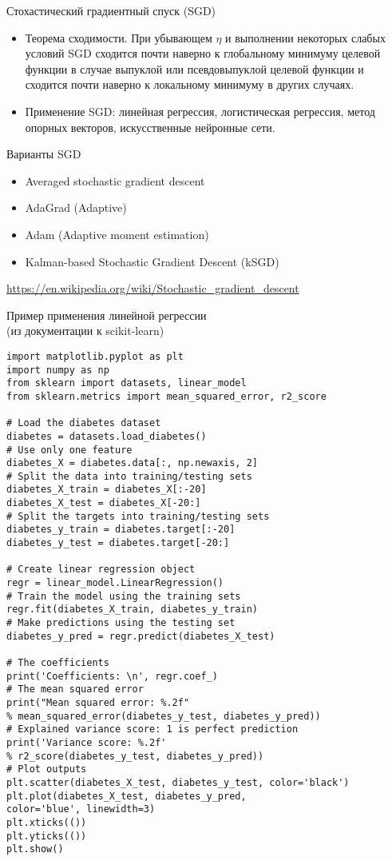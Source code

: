 \documentclass[landscape]{slides}
\begin{document}
\begin{slide}
Стохастический градиентный спуск (SGD)
\begin{itemize}
\item Теорема сходимости. При убывающем $\eta$ и выполнении некоторых слабых условий
SGD сходится почти наверно к глобальному минимуму целевой функции
в случае выпуклой или псевдовыпуклой целевой функции и сходится почти наверно
к локальному минимуму в других случаях.
\item Применение SGD: линейная регрессия, логистическая регрессия, метод опорных векторов,
искусственные нейронные сети.
\end{itemize}
\end{slide}

\begin{slide}
Варианты SGD
\begin{itemize}
\item Averaged stochastic gradient descent
\item AdaGrad (Adaptive)
\item Adam (Adaptive moment estimation)
\item Kalman-based Stochastic Gradient Descent (kSGD)
\end{itemize}
\url{https://en.wikipedia.org/wiki/Stochastic_gradient_descent}
\end{slide}

\begin{slide}
Пример применения линейной регрессии\\
(из документации к scikit-learn)
\begin{verbatim}
import matplotlib.pyplot as plt
import numpy as np
from sklearn import datasets, linear_model
from sklearn.metrics import mean_squared_error, r2_score

# Load the diabetes dataset
diabetes = datasets.load_diabetes()
# Use only one feature
diabetes_X = diabetes.data[:, np.newaxis, 2]
# Split the data into training/testing sets
diabetes_X_train = diabetes_X[:-20]
diabetes_X_test = diabetes_X[-20:]
# Split the targets into training/testing sets
diabetes_y_train = diabetes.target[:-20]
diabetes_y_test = diabetes.target[-20:]

# Create linear regression object
regr = linear_model.LinearRegression()
# Train the model using the training sets
regr.fit(diabetes_X_train, diabetes_y_train)
# Make predictions using the testing set
diabetes_y_pred = regr.predict(diabetes_X_test)

# The coefficients
print('Coefficients: \n', regr.coef_)
# The mean squared error
print("Mean squared error: %.2f"
% mean_squared_error(diabetes_y_test, diabetes_y_pred))
# Explained variance score: 1 is perfect prediction
print('Variance score: %.2f'
% r2_score(diabetes_y_test, diabetes_y_pred))
# Plot outputs
plt.scatter(diabetes_X_test, diabetes_y_test, color='black')
plt.plot(diabetes_X_test, diabetes_y_pred,
color='blue', linewidth=3)
plt.xticks(())
plt.yticks(())
plt.show()
\end{verbatim}
\end{slide}
\end{document}
